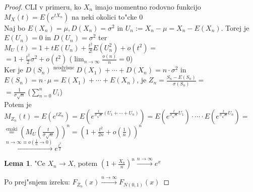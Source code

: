 \documentclass[a4paper,12pt]{article}
\theoremstyle{definition}
\newtheorem{lemma}[counter]{Lema}
\theoremstyle{remark}
\begin{document}
\begin{proof}
    CLI v primeru, ko $X_n$ imajo momentno rodovno funkcijo \\
    $M_X(t) = E(e^{t X_n})$ na neki okolici to"cke 0 \\
    Naj bo $E(X_n) = \mu, D(X_n) = \sigma^2$ in $U_n := X_n - \mu = X_n - E(X_n)$. Torej je $E(U_n) = 0$ in
    $D(U_n) = \sigma^2$ ter $M_{U}(t) = 1 + t E(U_n) + \frac{t^2}{2!} E(U_n^2) + o(t^2) =$ \\
    $= 1 + \frac{t^2}{2} \sigma^2 + o(t^2)$ ($\lim_{n \to \infty} \frac{o(n)}{n} = 0$) \\
    Ker je $D(S_n) \stackrel{\text{neodvisne}}{=} D(X_1) + \cdots + D(X_n) = n \cdot \sigma^2$ in
    $E(S_n) = n \cdot \mu = E(X_1) + \cdots + E(X_n)$, je $Z_n = \frac{S_n - E(S_n)}{\sigma(S_n)} =$ \\
    $= \frac{1}{\sigma \sqrt{n}}$ ($\sum_{n=0}^{n} U_i$) \\
    Potem je $M_{Z_n}(t) = E(e^{t Z_n}) = E(e^{\frac{t}{\sigma \sqrt{n}}(U_1 + \cdots + U_n)}) =
    E(e^{\frac{t}{\sigma \sqrt{n}} U_1}) \cdot \cdots \cdot E(e^{\frac{t}{\sigma \sqrt{n}} U_n}) =$ \\
    $\stackrel{\text{enaki}}{=} (M_U(\frac{t}{\sigma \sqrt{n}}))^n = (1 + \frac{t^2}{2n} + o(\frac{1}{n}))^n$ \\
    $\stackrel{n \to \infty \equiv o(\frac{1}{n} \to 0)}{\rightarrow} e^{\frac{t^2}{2}}$
    \begin{lemma}
        "Ce $X_n \to X$, potem $(1 + \frac{X_n}{n})^n \stackrel{n \to \infty}{\rightarrow} e^x$
    \end{lemma}
    Po prej"snjem izreku: $F_{Z_n}(x) \stackrel{n \to \infty}{\rightarrow} F_{N(0,1)}(x)$
\end{proof}
\end{document}
